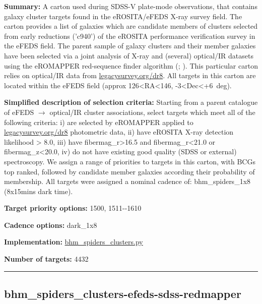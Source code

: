 \noindent\textbf{Summary:} A carton used during SDSS-V plate-mode observations,
that contains galaxy cluster targets found in the eROSITA/eFEDS X-ray
survey field. The carton provides a list of galaxies which are candidate
members of clusters selected from early reductions ('c940') of the
eROSITA performance verification survey in the eFEDS field. The parent
sample of galaxy clusters and their member galaxies have been selected
via a joint analysis of X-ray and (several) optical/IR datasets using
the eROMAPPER red-sequence finder algorithm
(\citealt{Rykoff2014};
\citealt{IderChitham2020}). This particular carton relies on optical/IR data
from \href{https://www.legacysurvey.org/dr8/}{legacysurvey.org/dr8}. All
targets in this carton are located within the eFEDS field (approx
126\textless{}RA\textless{}146, -3\textless{}Dec\textless{}+6~deg).

\noindent\textbf{Simplified description of selection criteria:} Starting from a
parent catalogue of eFEDS $\rightarrow$ optical/IR cluster associations, select
targets which meet all of the following criteria: i) are selected by
eROMAPPER applied to
\href{https://www.legacysurvey.org/dr8}{legacysurvey.org/dr8}
photometric data, ii) have eROSITA X-ray detection likelihood
\textgreater{} 8.0, iii) have fibermag\_r\textgreater{}16.5 and
fibermag\_r\textless{}21.0 or fibermag\_z\textless{}20.0, iv) do not
have existing good quality (SDSS or external) spectroscopy. We assign a
range of priorities to targets in this carton, with BCGs top ranked,
followed by candidate member galaxies according their probability of
membership. All targets were assigned a nominal cadence of:
bhm\_spiders\_1x8 (8x15mins dark time).


\noindent\textbf{Target priority options:} 1500, 1511-\/-1610

\noindent\textbf{Cadence options:} dark\_1x8

\noindent\textbf{Implementation:}
\href{https://github.com/sdss/target_selection/blob/0.1.0/python/target_selection/cartons/bhm_spiders_clusters.py}{bhm\_spiders\_clusters.py}

\noindent\textbf{Number of targets:} 4432

\begin{center}\rule{0.5\linewidth}{0.5pt}\end{center}

\hypertarget{bhm_spiders_clusters-efeds-sdss-redmapper_plan0.1.0}{%
\subsection{bhm\_spiders\_clusters-efeds-sdss-redmapper}\label{bhm_spiders_clusters-efeds-sdss-redmapper_plan0.1.0}}

